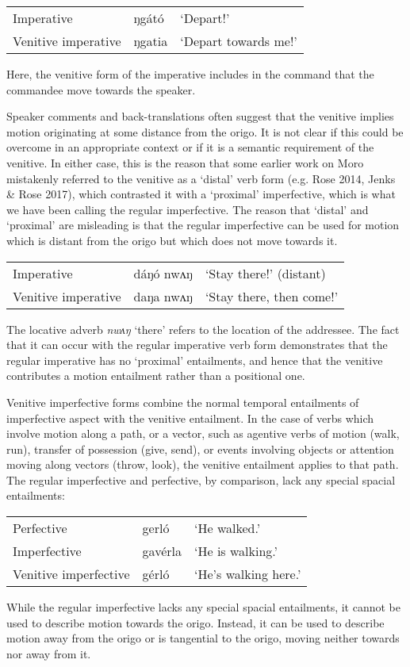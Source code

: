 \ea \begin{tabular}[t]{lll}
Imperative & ŋgátó	& 	‘Depart!’ \\
Venitive imperative & 	ŋgatia	& 	‘Depart towards me!’\\
\end{tabular}
\z
Here, the venitive form of the imperative includes in the command that the commandee move towards the speaker.


Speaker comments and back-translations often suggest that the venitive implies  motion originating at some distance from the origo. It is not clear if this could be overcome in an appropriate context or if it is a semantic requirement of the venitive. In either case, this is the reason that some earlier work on Moro mistakenly referred to the venitive as a `distal' verb form (e.g. Rose 2014, Jenks \& Rose 2017), which contrasted it with a `proximal' imperfective, which is what we have been calling the regular imperfective. The reason that `distal' and `proximal' are misleading is that the regular imperfective can be used for motion which is distant from the origo but which does not move towards it.
\ea \begin{tabular}[t]{lll}
Imperative & dáŋó nwʌŋ	& 	`Stay there!’ (distant) \\
Venitive imperative & 	daŋa nwʌŋ	& 	‘Stay there, then come!’\\
\end{tabular}
\z
The locative adverb \textit{nwʌŋ} `there' refers to the location of the addressee. The fact that it can occur with the regular imperative verb form demonstrates that the regular imperative has no `proximal' entailments, and hence that the venitive contributes a motion entailment rather than a positional one.

Venitive imperfective forms combine the normal temporal entailments of imperfective aspect with the venitive entailment. In the case of verbs which involve motion along a path, or a vector, such as agentive verbs of motion (walk, run), transfer of possession (give, send), or events involving objects or attention moving along vectors (throw, look), the venitive entailment applies to that path. The regular imperfective and perfective, by comparison, lack any special spacial entailments:
\ea \begin{tabular}[t]{lll}
Perfective &  gerló & `He walked.'\\
Imperfective & gavérla & `He is walking.'\\
Venitive imperfective &  gérló & `He’s walking here.'\\
\end{tabular} %
\z 
While the regular imperfective lacks any special spacial entailments, it cannot be used to describe motion towards the origo. Instead, it can be used to describe motion away from the origo or is tangential to the origo, moving neither towards nor away from it.

